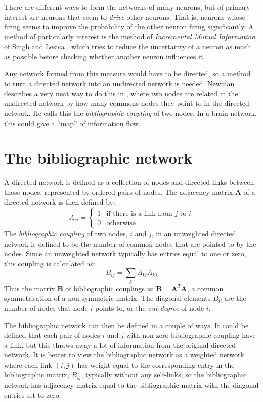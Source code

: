 There are different ways to form the networks of many neurons, but of primary interest are neurons that seem to {\sl drive} other neurons.  That 
is, neurons whose firing seems to improve the probability of the other neuron 
firing significantly.  A method of particularly interest is the method of 
{\sl Incremental Mutual Information} of Singh and Lesica 
\cite{SinghLesica2010a}, which tries to reduce the uncertainty of a neuron as 
much as possible before checking whether another neuron influences it.

Any network formed from this measure would have to be directed, so a 
method to turn a directed network into an undirected network is needed.  Newman describes 
a very neat way to do this in \cite{Newman2010a}, where two nodes are related 
in the undirected network by how many commons nodes they point to in the 
directed network.  He calls this the {\sl bibliographic coupling} of two 
nodes.  In a brain network, this could give a ``map'' of information flow.

\section{The bibliographic network}
A directed network is defined as a collection of nodes and directed links between those nodes, represented by ordered pairs of nodes.  The adjacency matrix $\mathbf{A}$ of a directed network is then defined by:
\begin{equation}
A_{ij} = \left\{ \begin{array}{ll} 1 & \text{if there is a link from $j$ to $i$} \\ 0 & \text{otherwise} \end{array}\right.
\end{equation}
The \emph{bibliographic coupling} of two nodes, $i$ and $j$, in an unweighted directed network is defined to be the number of common nodes that are pointed to by the nodes.  Since an unweighted network typically has entries equal to one or zero, this coupling is calculated as:
\begin{equation}
B_{ij} = \sum_k A_{ki} A_{kj}
\end{equation}
Thus the matrix $\mathbf{B}$ of bibliographic couplings is: $\mathbf{B} = \mathbf{A}^T\mathbf{A}$, a common symmetrisation of a non-symmetric matrix.  The diagonal elements $B_{ii}$ are the number of nodes that node $i$ points to, or the \emph{out degree} of node $i$.

The bibliographic network can then be defined in a couple of ways.  It could be defined that each pair of nodes $i$ and $j$ with non-zero bibliographic coupling have a link, but this throws away a lot of information from the original directed network.  It is better to view the bibliographic network as a weighted network where each link $(i,j)$ has weight equal to the corresponding entry in the bibliographic matrix, $B_{ij}$, typically without any self-links; so the bibliographic network has adjacency matrix equal to the bibliographic matrix with the diagonal entries set to zero.

